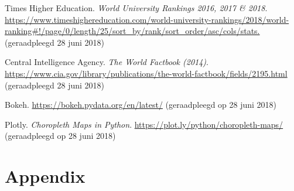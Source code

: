 \documentclass{uva-inf-article}
\begin{document}
\begin{thebibliography}{9}
Times Higher Education. \textit{World University Rankings 2016, 2017 \& 2018}. \url{https://www.timeshighereducation.com/world-university-rankings/2018/world-ranking#!/page/0/length/25/sort_by/rank/sort_order/asc/cols/stats.} (geraadpleegd 28 juni 2018)

Central Intelligence Agency. \textit{The World Factbook (2014)}. \url{https://www.cia.gov/library/publications/the-world-factbook/fields/2195.html}\\ (geraadpleegd 28 juni 2018)

Bokeh. \url{https://bokeh.pydata.org/en/latest/} (geraadpleegd op 28 juni 2018)

Plotly. \textit{Choropleth Maps in Python}. \url{https://plot.ly/python/choropleth-maps/}\\ (geraadpleegd op 28 juni 2018)

\end{thebibliography}

\section*{Appendix}
\end{document}
